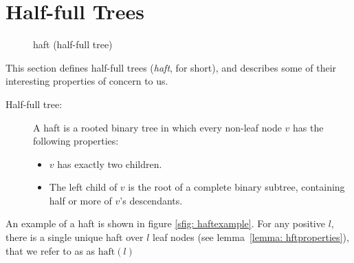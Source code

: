 \documentclass[11pt, letter]{article}
\newcommand{\haft}{\mathrm{haft}}
\begin{document}
\section{Half-full Trees}
\label{sec: hafts}

\begin{figure}[h!]
\centering
{}
\hspace{0.4in}
\caption{haft (half-full tree)}
\end{figure}


 This section defines half-full trees (\emph{haft}, for short), and describes some of their interesting properties of concern to us.






\begin{description}
\item[Half-full tree:] A haft is a rooted binary tree in which every non-leaf node $v$
has the following properties:
\begin{itemize}
 \item $v$ has exactly two children.
 \item The left child of $v$ is the root of a complete binary subtree, containing  half or more of $v$'s  descendants.
\end{itemize}
\end{description}

 An example of a haft is shown in figure \ref{sfig: haftexample}. For any positive $l$, there is a single unique haft over $l$ leaf nodes (see lemma~\ref{lemma: hftproperties}), that we refer to as as $\haft(l)$
\end{document}
